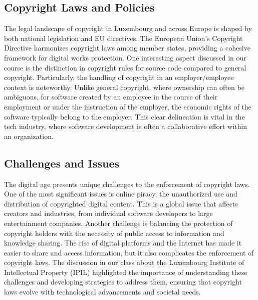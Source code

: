 \documentclass[10pt,a4paper]{article}
\begin{document}
\subsection*{Copyright Laws and Policies}
The legal landscape of copyright in Luxembourg and across Europe is shaped by both national legislation and EU directives. The European Union's Copyright Directive harmonizes copyright laws among member states, providing a cohesive framework for digital works protection. One interesting aspect discussed in our course is the distinction in copyright rules for source code compared to general copyright. Particularly, the handling of copyright in an employer/employee context is noteworthy. Unlike general copyright, where ownership can often be ambiguous, for software created by an employee in the course of their employment or under the instruction of the employer, the economic rights of the software typically belong to the employer. This clear delineation is vital in the tech industry, where software development is often a collaborative effort within an organization.

\subsection*{Challenges and Issues}
The digital age presents unique challenges to the enforcement of copyright laws. One of the most significant issues is online piracy, the unauthorized use and distribution of copyrighted digital content. This is a global issue that affects creators and industries, from individual software developers to large entertainment companies. Another challenge is balancing the protection of copyright holders with the necessity of public access to information and knowledge sharing. The rise of digital platforms and the Internet has made it easier to share and access information, but it also complicates the enforcement of copyright laws. The discussion in our class about the Luxembourg Institute of Intellectual Property (IPIL) highlighted the importance of understanding these challenges and developing strategies to address them, ensuring that copyright laws evolve with technological advancements and societal needs.
\end{document}
